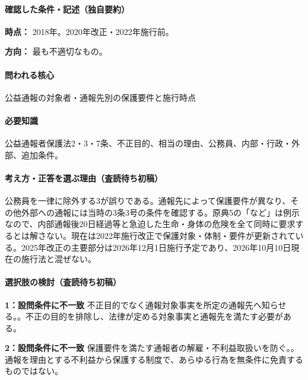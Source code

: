 \paragraph{確認した条件・記述（独自要約）}\mbox{}\par

\noindent\textbf{時点：} 2018年。2020年改正・2022年施行前。\par

\noindent\textbf{方向：} 最も不適切なもの。\par

\paragraph{問われる核心} 公益通報の対象者・通報先別の保護要件と施行時点

\paragraph{必要知識} 公益通報者保護法2・3・7条、不正目的、相当の理由、公務員、内部・行政・外部、追加条件。

\paragraph{考え方・正答を選ぶ理由（査読待ち初稿）} 公務員を一律に除外する3が誤りである。通報先によって保護要件が異なり、その他外部への通報には当時の3条3号の条件を確認する。原典5の「など」は例示なので、内部通報後20日経過等と急迫した生命・身体の危険を全て同時に要求するとは解さない。現在は2022年施行改正で保護対象・体制・要件が更新されている。2025年改正の主要部分は2026年12月1日施行予定であり、2026年10月10日現在の施行法と混ぜない。

\paragraph{選択肢の検討（査読待ち初稿）}\mbox{}\par

\noindent\textbf{1：設問条件に不一致} 不正目的でなく通報対象事実を所定の通報先へ知らせる。。不正の目的を排除し、法律が定める対象事実と通報先を満たす必要がある。\par

\noindent\textbf{2：設問条件に不一致} 保護要件を満たす通報者の解雇・不利益取扱いを防ぐ。。通報を理由とする不利益から保護する制度で、あらゆる行為を無条件に免責するものではない。\par

